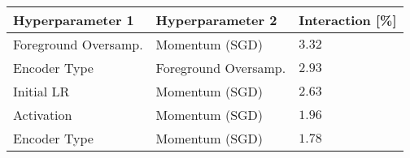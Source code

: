 \begin{tabular}{lll}
\toprule
Hyperparameter 1 & Hyperparameter 2 & Interaction [\%] \\
\midrule
Foreground Oversamp. & Momentum (SGD) & $3.32$ \\
Encoder Type & Foreground Oversamp. & $2.93$ \\
Initial LR & Momentum (SGD) & $2.63$ \\
Activation & Momentum (SGD) & $1.96$ \\
Encoder Type & Momentum (SGD) & $1.78$ \\
\bottomrule
\end{tabular}
